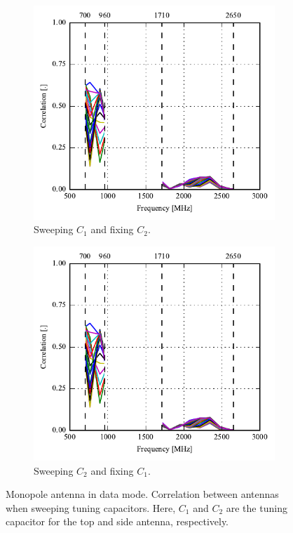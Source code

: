 \begin{figure}[htbp]
    \centering
    \begin{subfigure}{0.49\linewidth}
        \includegraphics{img/tech_sol/monopole/highband/ue/datamode/corr_top.pdf}
        \caption{Sweeping $C_1$ and fixing $C_2$.}
    \end{subfigure}
    \hfill
    \begin{subfigure}{0.49\linewidth}
        \includegraphics{img/tech_sol/monopole/highband/ue/datamode/corr_top.pdf}
        \caption{Sweeping $C_2$ and fixing $C_1$.}
    \end{subfigure}
    \caption{Monopole antenna in data mode. Correlation between antennas when sweeping tuning capacitors. Here, $C_1$ and $C_2$ are the tuning capacitor for the top and side antenna, respectively.}
    \label{fig:corr_mono_modi_data_mode}
\end{figure}

